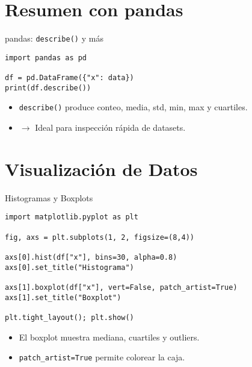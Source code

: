 \documentclass[10pt]{beamer}
\begin{document}
\section{Resumen con pandas}
\begin{frame}[fragile]{pandas: \texttt{describe()} y más}
\begin{verbatim}
import pandas as pd

df = pd.DataFrame({"x": data})
print(df.describe())
\end{verbatim}
\begin{itemize}
  \item \texttt{describe()} produce conteo, media, std, min, max y cuartiles.
  \item \(\rightarrow\) Ideal para inspección rápida de datasets.
\end{itemize}
\end{frame}

\section{Visualización de Datos}
\begin{frame}[fragile]{Histogramas y Boxplots}
\begin{verbatim}
import matplotlib.pyplot as plt

fig, axs = plt.subplots(1, 2, figsize=(8,4))

axs[0].hist(df["x"], bins=30, alpha=0.8)
axs[0].set_title("Histograma")

axs[1].boxplot(df["x"], vert=False, patch_artist=True)
axs[1].set_title("Boxplot")

plt.tight_layout(); plt.show()
\end{verbatim}
\begin{itemize}
  \item El boxplot muestra mediana, cuartiles y outliers.
  \item \texttt{patch\_artist=True} permite colorear la caja.
\end{itemize}
\end{frame}

\end{document}
